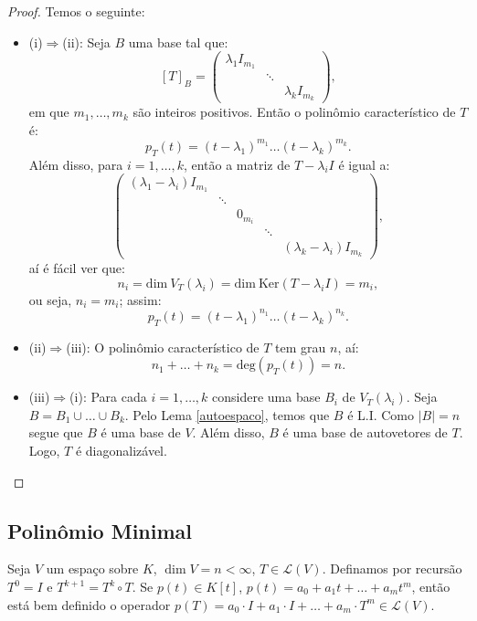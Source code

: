 \documentclass[11pt,twoside,a4paper]{book}
\begin{document}
\begin{proof}
Temos o seguinte:
\begin{itemize}
\item (i)$\Rightarrow$(ii): Seja $B$ uma base tal que:
\[
[T]_B=\begin{pmatrix}
\lambda_1I_{m_1}&&\\&\ddots&\\&&\lambda_kI_{m_k}
\end{pmatrix},
\]
em que $m_1,\dots,m_k$ são inteiros positivos. Então o polinômio característico de $T$ é:
\[
p_T(t)=(t-\lambda_1)^{m_1}\ldots(t-\lambda_k)^{m_k}.
\]
Além disso, para $i=1,\dots,k$, então a matriz de $T-\lambda_iI$ é igual a:
\[
\begin{pmatrix}
(\lambda_1-\lambda_i)I_{m_1}&&&&\\&\ddots&&&\\&&0_{m_i}&&\\&&&\ddots&\\&&&&(\lambda_k-\lambda_i)I_{m_k}
\end{pmatrix},
\]
aí é fácil ver que:
\[
n_i=\mathrm{dim} \ V_T(\lambda_i)=\mathrm{dim} \ \mathrm{Ker}(T-\lambda_iI)=m_i,
\]
ou seja, $n_i=m_i$; assim:
\[
p_T(t)=(t-\lambda_1)^{n_1}\ldots(t-\lambda_k)^{n_k}.
\]
\item (ii)\(\Rightarrow\)(iii): O polinômio característico de $T$ tem grau $n$, aí:
\[
n_1+\ldots+n_k=\text{deg}(p_T(t))=n.
\]
\item (iii)\(\Rightarrow\)(i): Para cada \(i=1,\dots,k\) considere uma base \(B_i\)
de \(V_T(\lambda_i)\). Seja \(B=B_1\cup\dots\cup B_k\). Pelo Lema \ref{autoespaco},
temos que \(B\) é L.I. Como \(\vert B\vert =n\) segue que \(B\) é uma base de
\(V\). Além disso, \(B\) é uma base de autovetores de \(T\). Logo, \(T\) é diagonalizável.
\end{itemize}
\end{proof}

\subsection{Polinômio Minimal}

\begin{definicao}
Seja $V$ um espaço sobre $K$, $\dim V=n<\infty$, $T\in\mathcal{L}(V)$. Definamos por recursão $T^0=I$ e $T^{k+1}=T^k\circ T$. Se $p(t)\in K[t]$, $p(t)=a_0+a_1t+\dots+a_mt^m$, então está bem definido o operador $p(T)=a_0\cdot I+a_1\cdot I+\dots+a_m\cdot T^m\in\mathcal{L}(V)$.
\end{definicao}
\end{document}
